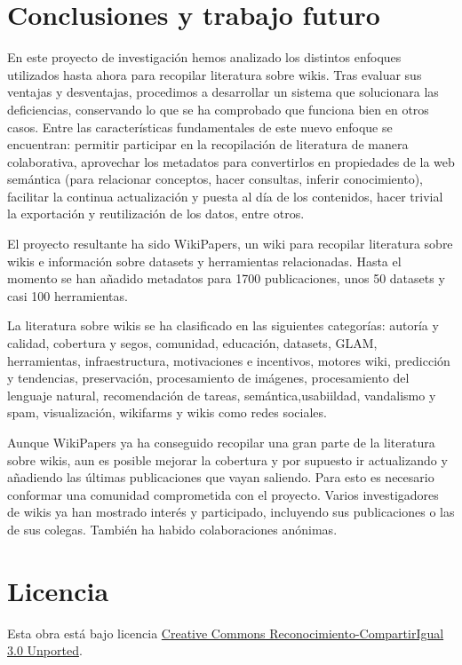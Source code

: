 \documentclass[11pt,onecolumn]{article}
\begin{document}
\clearpage

\section{Conclusiones y trabajo futuro}


En este proyecto de investigación hemos analizado los distintos enfoques utilizados hasta ahora para recopilar literatura sobre wikis. Tras evaluar sus ventajas y desventajas, procedimos a desarrollar un sistema que solucionara las deficiencias, conservando lo que se ha comprobado que funciona bien en otros casos. Entre las características fundamentales de este nuevo enfoque se encuentran: permitir participar en la recopilación de literatura de manera colaborativa, aprovechar los metadatos para convertirlos en propiedades de la web semántica (para relacionar conceptos, hacer consultas, inferir conocimiento), facilitar la continua actualización y puesta al día de los contenidos, hacer trivial la exportación y reutilización de los datos, entre otros.

El proyecto resultante ha sido WikiPapers, un wiki para recopilar literatura sobre wikis e información sobre datasets y herramientas relacionadas. Hasta el momento se han añadido metadatos para 1700 publicaciones, unos 50 datasets y casi 100 herramientas.

La literatura sobre wikis se ha clasificado en las siguientes categorías: autoría y calidad, cobertura y segos, comunidad, educación, datasets, GLAM, herramientas, infraestructura, motivaciones e incentivos, motores wiki, predicción y tendencias, preservación, procesamiento de imágenes, procesamiento del lenguaje natural, recomendación de tareas, semántica,usabiildad, vandalismo y spam, visualización, wikifarms y wikis como redes sociales.

Aunque WikiPapers ya ha conseguido recopilar una gran parte de la literatura sobre wikis, aun es posible mejorar la cobertura y por supuesto ir actualizando y añadiendo las últimas publicaciones que vayan saliendo. Para esto es necesario conformar una comunidad comprometida con el proyecto. Varios investigadores de wikis ya han mostrado interés y participado, incluyendo sus publicaciones o las de sus colegas. También ha habido colaboraciones anónimas.



\clearpage

        


\section*{Licencia}
Esta obra está bajo licencia \href{http://creativecommons.org/licenses/by-sa/3.0/}{Creative Commons Reconocimiento-CompartirIgual 3.0 Unported}.
\end{document}

